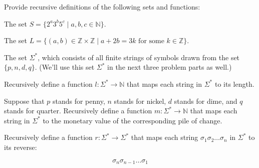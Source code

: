 \documentclass[handout]{mcs}
\begin{document}
\begin{problem}
Provide recursive definitions of the following sets and functions:

\begin{problemparts}

\problempart The set $S = \{ 2^a 3^b 5^c \mid a, b, c \in \mathbb{N}
\}$.

\problempart The set $L = \{ (a, b) \in \mathbb{Z} \times \mathbb{Z}
\mid \text{$a + 2b = 3k$ for some $k \in \mathbb{Z}$} \}$.

\problempart The set $\Sigma^*$, which consists of all finite strings
of symbols drawn from the set $\{ p, n, d, q \}$.  (We'll use this set
$\Sigma^*$ in the next three problem parts as well.)

\problempart Recursively define a function $l : \Sigma^* \to
\mathbb{N}$ that maps each string in $\Sigma^*$ to its length.


\problempart Suppose that $p$ stands for penny, $n$ stands for nickel,
$d$ stands for dime, and $q$ stands for quarter.  Recursively define a
function $m : \Sigma^* \to \mathbb{N}$ that maps each string in
$\Sigma^*$ to the monetary value of the corresponding pile of change.


\problempart Recursively define a function $r : \Sigma^* \to \Sigma^*$
that maps each string $\sigma_1 \sigma_2 \ldots \sigma_{n}$ in
$\Sigma^*$ to its reverse:

\[
\sigma_n \sigma_{n-1} \ldots \sigma_1
\]

\end{problemparts}
\end{problem}
\end{document}
